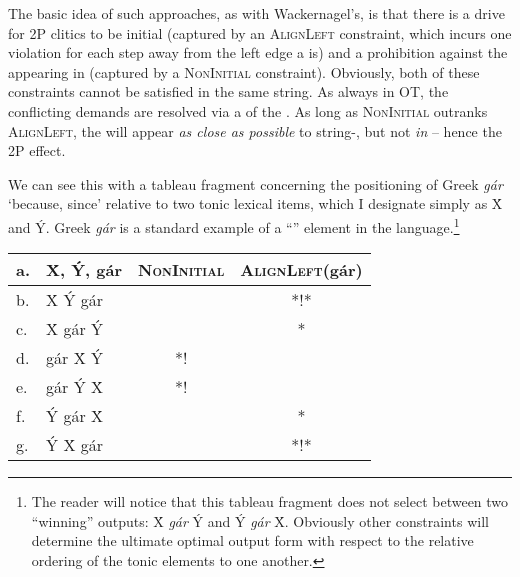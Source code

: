 \documentclass[output=paper,
modfonts
]{LSP/langsci}
\begin{document}
The basic idea of such approaches, as with Wackernagel's, is that there is
a drive for 2P clitics to be initial (captured by an \textsc{AlignLeft} constraint, which
incurs one violation for each step away from the left edge a  is) and a prohibition
against the  appearing in  (captured by a \textsc{NonInitial} constraint).
Obviously, both of these constraints cannot be satisfied in the same string. As always
in OT, the conflicting demands are resolved via a  of the . As long as
\textsc{NonInitial} outranks \textsc{AlignLeft}, the  will appear \textit{as close
as possible} to string-, but not \textit{in}  -- hence
the 2P effect.

We can see this with a tableau fragment concerning the positioning of Greek \textit{gár} `because,
since' relative to two tonic lexical items, which I designate simply as \'{X} and \'{Y}. Greek
\textit{gár} is a standard example of a ``'' element in the language.\footnote{The
reader will notice that this tableau fragment does not select between two ``winning'' outputs:
\'{X} \textit{gár} \'{Y} and \'{Y} \textit{gár} \'{X}. Obviously other constraints will determine
the ultimate optimal output form with respect to the relative ordering of the tonic elements to
one another.}

\begin{exe}
\ex\begin{tabular}[t]{|ll||c|c|}
\firsthline
a. & \'{X}, \'{Y}, gár & \textsc{NonInitial} & \textsc{AlignLeft}(gár) \\ \hline\hline
b. & \'{X} \'{Y} gár &  & \cellcolor{lightgray}*!* \\\hline
c. & \'{X} gár \'{Y} &  & * \\\hline
d. & gár \'{X} \'{Y} & \cellcolor{lightgray}*! & \cellcolor{lightgray} \\\hline
e. & gár \'{Y} \'{X} & \cellcolor{lightgray}*! & \cellcolor{lightgray} \\\hline
f. & \'{Y} gár \'{X} &  & * \\\hline
g. & \'{Y} \'{X} gár &  & \cellcolor{lightgray}*!* \\\hline
\end{tabular}
\end{exe}
\end{document}
